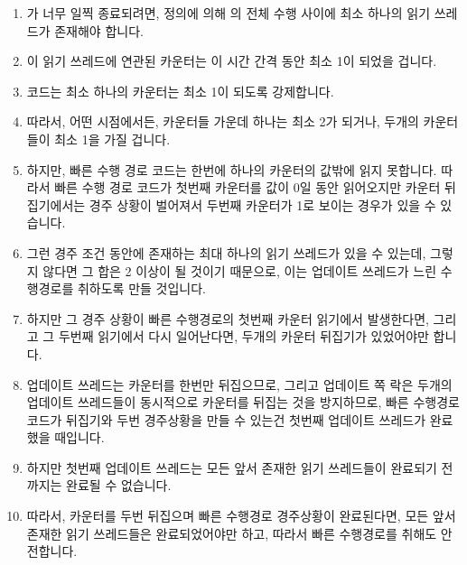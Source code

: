 \begin{enumerate}
\item	{} 가 너무 일찍 종료되려면, 정의에 의해
	 의 전체 수행 사이에 최소 하나의 읽기 쓰레드가
	존재해야 합니다.
\item	이 읽기 쓰레드에 연관된 카운터는 이 시간 간격 동안 최소 1이 되었을
	겁니다.
\item	{} 코드는 최소 하나의 카운터는 최소 1이 되도록
	강제합니다.
\item	따라서, 어떤 시점에서든, 카운터들 가운데 하나는 최소 2가 되거나, 두개의
	카운터들이 최소 1을 가질 겁니다.
\item	하지만,  빠른 수행 경로 코드는 한번에 하나의
	카운터의 값밖에 읽지 못합니다.
	따라서 빠른 수행 경로 코드가 첫번째 카운터를 값이 0일 동안 읽어오지만
	카운터 뒤집기에서는 경주 상황이 벌어져서 두번째 카운터가 1로 보이는
	경우가 있을 수 있습니다.
\iffalse

\item	For \co{synchronize_qrcu()} to exit too early, then
	by definition there must have been at least one reader
	present during \co{synchronize_qrcu()}'s full
	execution.
\item	The counter corresponding to this reader will have been
	at least 1 during this time interval.
\item	The \co{synchronize_qrcu()} code forces at least one
	of the counters to be at least 1 at all times.
\item	Therefore, at any given point in time, either one of the
	counters will be at least 2, or both of the counters will
	be at least one.
\item	However, the \co{synchronize_qrcu()} fastpath code
	can read only one of the counters at a given time.
	It is therefore possible for the fastpath code to fetch
	the first counter while zero, but to race with a counter
	flip so that the second counter is seen as one.
\fi
\item	그런 경주 조건 동안에 존재하는 최대 하나의 읽기 쓰레드가 있을 수
	있는데, 그렇지 않다면 그 합은 2 이상이 될 것이기 때문으로, 이는
	업데이트 쓰레드가 느린 수행경로를 취하도록 만들 것입니다.
\item	하지만 그 경주 상황이 빠른 수행경로의 첫번째 카운터 읽기에서
	발생한다면, 그리고 그 두번째 읽기에서 다시 일어난다면, 두개의 카운터
	뒤집기가 있었어야만 합니다.
\item	업데이트 쓰레드는 카운터를 한번만 뒤집으므로, 그리고 업데이트 쪽 락은
	두개의 업데이트 쓰레드들이 동시적으로 카운터를 뒤집는 것을 방지하므로,
	빠른 수행경로 코드가 뒤집기와 두번 경주상황을 만들 수 있는건 첫번째
	업데이트 쓰레드가 완료했을 때입니다.
\item	하지만 첫번째 업데이트 쓰레드는 모든 앞서 존재한 읽기 쓰레드들이
	완료되기 전까지는 완료될 수 없습니다.
\item	따라서, 카운터를 두번 뒤집으며 빠른 수행경로 경주상황이 완료된다면,
	모든 앞서 존재한 읽기 쓰레드들은 완료되었어야만 하고, 따라서 빠른
	수행경로를 취해도 안전합니다.
\iffalse


\end{enumerate}
